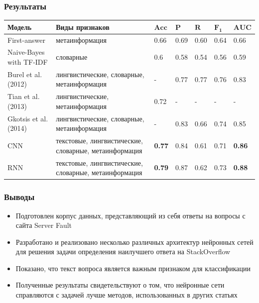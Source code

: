\documentclass[10pt]{beamer}
\begin{document}

\begin{frame}
\frametitle{Результаты}

\begin{center}
	\small
    \begin{tabularx}{\textwidth}{| l | X | l | l | l | l | l |}
        \hline
	    \textbf{Модель} & \textbf{Виды признаков} & $\mathbf{Acc}$ & $\mathbf{P}$ & $\mathbf{R}$ & $\mathbf{F_1}$ & $\mathbf{AUC}$ \\ \hline
        \hline
	    First-answer & метаинформация & 0.66 & 0.69 & 0.60 & 0.64 & 0.66 \\ \hline
    	Naive-Bayes with TF-IDF & словарные & 0.6 & 0.58 & 0.54 & 0.56 & 0.59 \\ \hline
        \hline
	    Burel et al. (2012) & лингвистические, словарные, метаинформация & - & 0.77 & 0.77 & 0.76 & 0.83 \\ \hline
    	Tian et al. (2013) & лингвистические, метаинформация & 0.72 & - & - & - & - \\ \hline
        Gkotsis et al. (2014) & лингвистические, словарные, метаинформация & - & 0.83 & 0.66 & 0.74 & 0.85 \\ \hline
	    \hline
        CNN & текстовые, лингвистические, словарные, метаинформация & \textbf{0.77} & 0.84 & 0.61 & 0.71 & \textbf{0.86} \\ \hline
	    RNN & текстовые, лингвистические, словарные, метаинформация & \textbf{0.79} & 0.87 & 0.62 & 0.73 & \textbf{0.88} \\ \hline
    \end{tabularx}
\end{center}
\end{frame}


\begin{frame}
\frametitle{Выводы}

\begin{itemize}
	\item Подготовлен корпус данных, представляющий из себя ответы на вопросы с сайта Server Fault
	\item Разработано и реализовано несколько различных архитектур нейронных сетей для решения задачи определения наилучшего ответа на StackOverflow
	\item Показано, что текст вопроса является важным признаком для классификации
	\item Полученные результаты свидетельствуют о том, что нейронные сети справляются с задачей лучше методов, использованных в других статьях
\end{itemize}

\end{frame}


\end{document}
